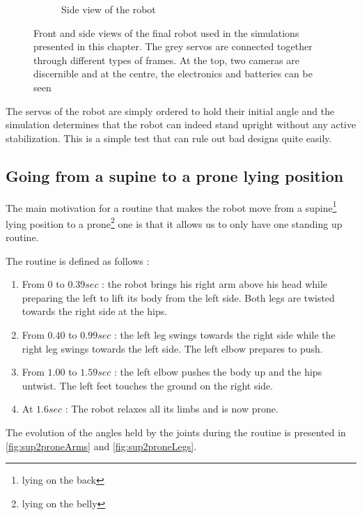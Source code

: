\begin{figure}[htp]
\begin{subfigure}[b]{0.45\textwidth}
    \caption[]{Side view of the robot}
    \label{fig:robotv7_side}
\end{subfigure}
\caption[]{Front and side views of the final robot used in the simulations presented in this chapter. The grey servos are connected together through different types of frames. At the top, two cameras are discernible and at the centre, the electronics and batteries can be seen}
\label{fig:robotv7}
\end{figure}

The servos of the robot are simply ordered to hold their initial angle and the simulation determines that the robot can indeed stand upright without any active stabilization. This is a simple test that can rule out bad designs quite easily.

\subsection{Going from a supine to a prone lying position}
The main motivation for a routine that makes the robot move from a supine\footnote{lying on the back} lying position to a prone\footnote{lying on the belly} one is that it allows us to only have one standing up routine. 

The routine is defined as follows :\begin{enumerate}
\item From $0$ to $0.39sec$ : the robot brings his right arm above his head while preparing the left to lift its body from the left side. Both legs are twisted towards the right side at the hips.

\item From $0.40$ to $0.99sec$ : the left leg swings towards the right side while the right leg swings towards the left side. The left elbow prepares to push.

\item From $1.00$ to $1.59sec$ : the left elbow pushes the body up and the hips untwist. The left feet touches the ground on the right side.

\item At $1.6sec$ : The robot relaxes all its limbs and is now prone.
\end{enumerate}

The evolution of the angles held by the joints during the routine is presented in \cref{fig:sup2proneArms} and \cref{fig:sup2proneLegs}. 

